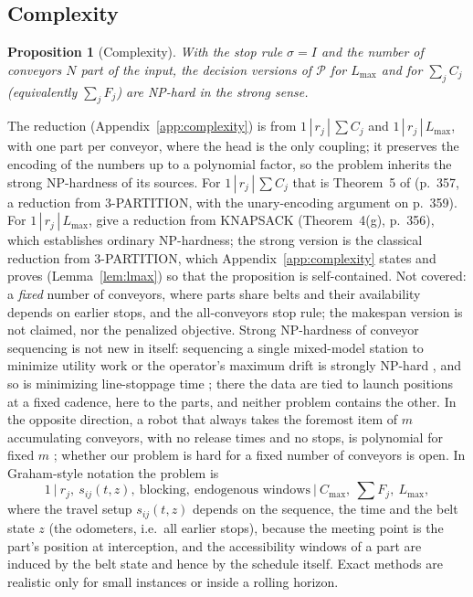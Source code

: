 \documentclass[11pt,a4paper]{article}
\theoremstyle{plain}
\newtheorem{proposition}{Proposition}
\theoremstyle{definition}
\theoremstyle{remark}
\newcommand{\Pb}{\mathcal{P}}
\begin{document}
\subsection{Complexity}
\begin{proposition}[Complexity]\label{prop:complexity}
With the stop rule $\sigma=I$ and the number of conveyors $N$ part of the input, the
decision versions of $\Pb$ for $L_{\max}$ and for $\sum_jC_j$ (equivalently $\sum_jF_j$)
are NP-hard in the strong sense.
\end{proposition}
The reduction (Appendix~\ref{app:complexity}) is from $1\,|\,r_j\,|\,\sum C_j$ and
$1\,|\,r_j\,|\,L_{\max}$, with one part per conveyor, where the head is the only
coupling; it preserves the encoding of the numbers up to a polynomial factor, so the
problem inherits the strong NP-hardness of its sources. For $1\,|\,r_j\,|\,\sum C_j$
that is Theorem~5 of \cite{Lenstra1977} (p.~357, a reduction from 3-PARTITION, with
the unary-encoding argument on p.~359). For $1\,|\,r_j\,|\,L_{\max}$,
\cite{Lenstra1977} give a reduction from KNAPSACK (Theorem~4(g), p.~356), which
establishes ordinary NP-hardness; the strong version is the classical reduction from
3-PARTITION, which Appendix~\ref{app:complexity} states and proves
(Lemma~\ref{lem:lmax}) so that the proposition is self-contained.
Not covered: a \emph{fixed} number of conveyors, where parts share belts
and their availability depends on earlier stops, and the all-conveyors stop rule; the
makespan version is not claimed, nor the penalized objective. Strong NP-hardness of
conveyor sequencing is not new in itself: sequencing a single mixed-model station to
minimize utility work or the operator's maximum drift is strongly NP-hard \cite{Tsai1995},
and so is minimizing line-stoppage time \cite{Xiaobo2000}; there the data are tied to launch
positions at a fixed cadence, here to the parts, and neither problem contains the other. In
the opposite direction, a robot that always takes the foremost item of $m$ accumulating
conveyors, with no release times and no stops, is polynomial for fixed $m$ \cite{Li2026};
whether our problem is hard for a fixed number of conveyors is open. In Graham-style
notation the problem is
\[
1\ \big|\ r_j,\ s_{ij}(t,z),\ \text{blocking},\ \text{endogenous windows}\ \big|\ C_{\max},\ \textstyle\sum F_j,\ L_{\max},
\]
where the travel setup $s_{ij}(t,z)$ depends on the sequence, the time and the belt
state $z$ (the odometers, i.e.\ all earlier stops), because the meeting point is the
part's position at interception, and the accessibility windows of a part are induced by
the belt state and hence by the schedule itself. Exact methods are realistic only for
small instances or inside a rolling horizon.
\end{document}

